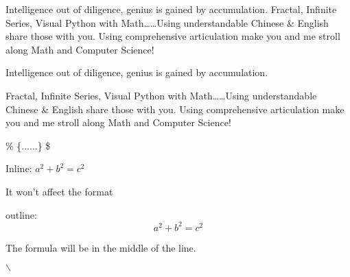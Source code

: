 \documentclass{article}
\begin{document}
	
	Intelligence out of diligence, genius is gained by accumulation.
	Fractal, Infinite Series, Visual Python with Math……Using understandable Chinese & English share those with you. Using comprehensive articulation make you and me stroll along Math and Computer Science!
	
	Intelligence out of diligence, genius is gained by accumulation.
	
	Fractal, Infinite Series, Visual Python with Math……Using understandable Chinese & English share those with you. Using comprehensive articulation make you and me stroll along Math and Computer Science!
	
	\% \{......\} \$  
	
	Inline: $a^2 + b^2 = c^2$
	
	It won't affect the format
	
	outline: $$a^2 + b^2 = c^2$$
	
	The formula will be in the middle of the line.
	
	$\backslash$
	
\end{document}
